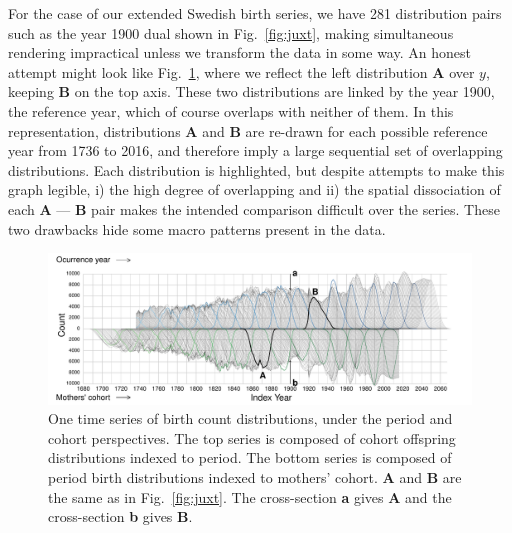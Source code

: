 \documentclass{article}
\begin{document}
For the case of our extended Swedish birth series, we have 281 distribution pairs such as the year 1900 dual shown in Fig.~\ref{fig:juxt}, making simultaneous rendering impractical unless we transform the data in some way. An honest attempt might look like Fig.~\ref{fig:reflect1}, where we reflect the left distribution \textbf{A} over $y$, keeping \textbf{B} on the top axis. These two distributions are linked by the year 1900, the reference year, which of course overlaps with neither of them. In this representation, distributions \textbf{A} and \textbf{B} are re-drawn for each possible reference year from 1736 to 2016, and therefore imply a large sequential set of overlapping distributions. Each  distribution is highlighted, but despite attempts to make this graph legible, i) the high degree of overlapping and ii) the spatial dissociation of each \textbf{A} --- \textbf{B} pair makes the intended comparison difficult over the series. These two drawbacks hide some macro patterns present in the data.

\begin{figure}[ht!]
 \centering
        \includegraphics[width=\textwidth]{Figures/FxFlowReflect.pdf}
        \caption{One time series of birth count distributions, under the period and cohort perspectives. The top series is composed of cohort offspring distributions indexed to period. The bottom series is composed of period birth distributions indexed to mothers' cohort. \textbf{A} and \textbf{B} are the same as in Fig.~\ref{fig:juxt}. The cross-section \textbf{a} gives \textbf{A} and the cross-section \textbf{b} gives \textbf{B}.}
          \label{fig:reflect1}
\end{figure}
\end{document}
